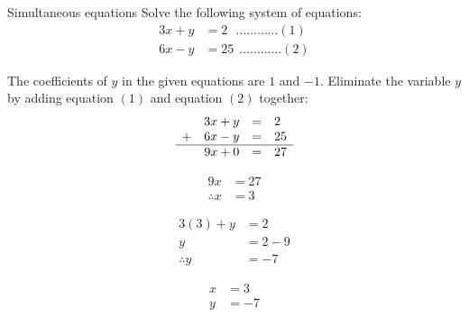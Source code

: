 \begin{wex}
{Simultaneous equations }
{Solve the following system of equations:
\begin{align*}
  3x+y &= 2  ~~~\ldots \ldots \ldots \ldots (1)\\
  6x-y &= 25 ~~\ldots \ldots \ldots \ldots (2)
\end{align*}
}
{
The coefficients of $y$ in the given equations are $1$ and $-1$. Eliminate the variable $y$ by adding equation $(1)$ and equation $(2)$ together:
\begin{equation*}
\begin{array}{ccll}\hfill & 3x+y& =& 2\hfill \\ 
\hfill+ & 6x-y& =& 25\hfill \\ \hline
 \hfill & 9x + 0 &=& 27
\end{array}
\end{equation*}

\begin{align*}
  9x &= 27 \\
  \therefore x &= 3
\end{align*}

\begin{align*}
  3(3) + y &= 2 \\
  y &= 2-9 \\
  \therefore y &= -7 
\end{align*}


\begin{align*}
 x &= 3 \\
 y &= -7
\end{align*}
}
\end{wex}

